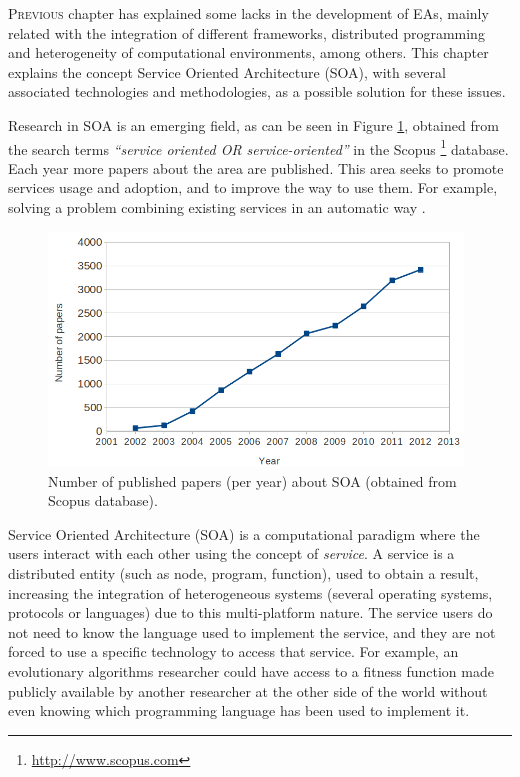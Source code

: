 \label{chap:soa}
\minitoc\mtcskip
\vfill
\lettrine{P}{revious} chapter has explained some lacks in the development of EAs, mainly related with the integration of different frameworks, distributed programming and heterogeneity of computational environments, among others. This chapter explains the concept Service Oriented Architecture (SOA), with several associated technologies and methodologies, as a possible solution for these issues.

Research in SOA \citep{Papazoglou2007SOA} is an emerging field, as can be seen in Figure \ref{fig:soapapers}, obtained from the search terms {\em ``service oriented OR service-oriented''} in the Scopus \footnote{\url{http://www.scopus.com}} database. Each year more papers about the area are published. This area seeks to promote services usage and adoption, and to improve the way to use them. For example, solving a problem combining existing services in an automatic way \citep{Moussa2010ServiceComposition}.





\begin{figure}
\centering
\includegraphics[width=26pc]{gfx/soa/papersYear.jpg}
\caption{Number of published papers (per year) about SOA (obtained from Scopus database).}
\label{fig:soapapers}
\end{figure}


Service Oriented Architecture (SOA) is a computational
paradigm where the users interact with each other using the concept of
{\em service}. A service is a distributed entity (such as node, program,
function), used to obtain a result, increasing the integration of heterogeneous
systems (several operating systems, protocols or languages) due to
this multi-platform nature. The service users do not need to know
the language used to implement the service, and they are not
forced to use a specific technology to access that service. For
example, an evolutionary algorithms researcher could have access to a
fitness function made publicly available by another researcher at the
other side of the world without even knowing which programming language
has been used to implement it.

